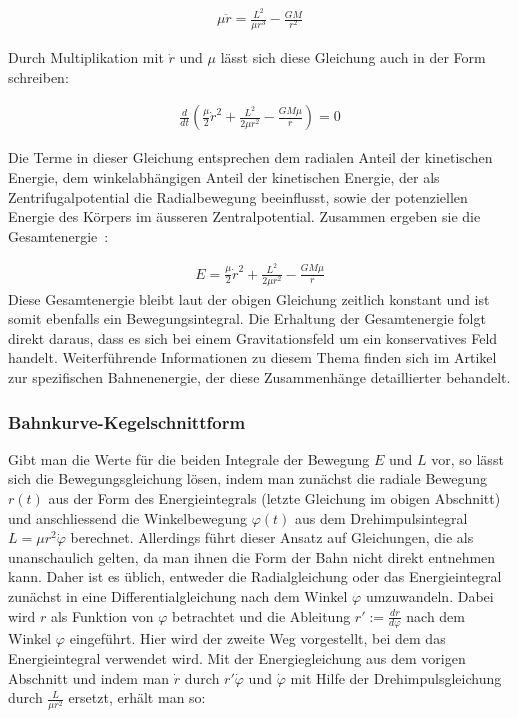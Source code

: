 \documentclass[a4paper,12pt,twoside]{article}
\begin{document}
\begin{align*}
	\mu \ddot{r} = \frac{L^2}{\mu r^3} - \frac{G M}{r^2}
\end{align*}

Durch Multiplikation mit \( \dot{r} \) und \( \mu \) lässt sich diese Gleichung auch in der Form schreiben:

\begin{align*}
	\frac{d}{dt} \left( \frac{\mu}{2} \dot{r}^2 + \frac{L^2}{2 \mu r^2} - \frac{GM \mu}{r} \right) = 0
\end{align*}

Die Terme in dieser Gleichung entsprechen dem radialen Anteil der kinetischen Energie, dem winkelabhängigen Anteil der kinetischen Energie, der als Zentrifugalpotential die Radialbewegung beeinflusst, sowie der potenziellen Energie des Körpers im äusseren Zentralpotential. Zusammen ergeben sie die Gesamtenergie~\cite{Physik-Schule}:

\begin{align*}
	E = \frac{\mu}{2} \dot{r}^2 + \frac{L^2}{2 \mu r^2} - \frac{GM \mu}{r}
\end{align*}
Diese Gesamtenergie bleibt laut der obigen Gleichung zeitlich konstant und ist somit ebenfalls ein Bewegungsintegral. Die Erhaltung der Gesamtenergie folgt direkt daraus, dass es sich bei einem Gravitationsfeld um ein konservatives Feld handelt. Weiterführende Informationen zu diesem Thema finden sich im Artikel zur spezifischen Bahnenenergie, der diese Zusammenhänge detaillierter behandelt.

\subsubsection{Bahnkurve-Kegelschnittform}

Gibt man die Werte für die beiden Integrale der Bewegung \( E \) und \( L \) vor, so lässt sich die Bewegungsgleichung lösen, indem man zunächst die radiale Bewegung \( r(t) \) aus der Form des Energieintegrals (letzte Gleichung im obigen Abschnitt) und anschliessend die Winkelbewegung \( \varphi(t) \) aus dem Drehimpulsintegral \( L = \mu r^2 \dot{\varphi} \) berechnet. 
Allerdings führt dieser Ansatz auf Gleichungen, die als unanschaulich gelten, da man ihnen die Form der Bahn nicht direkt entnehmen kann. 
Daher ist es üblich, entweder die Radialgleichung oder das Energieintegral zunächst in eine Differentialgleichung nach dem Winkel \( \varphi \) umzuwandeln. Dabei wird \( r \) als Funktion von \( \varphi \) betrachtet und die Ableitung \( r' := \frac{dr}{d\varphi} \) nach dem Winkel \( \varphi \) eingeführt. 
Hier wird der zweite Weg vorgestellt, bei dem das Energieintegral verwendet wird. 
Mit der Energiegleichung aus dem vorigen Abschnitt und indem man \( \dot{r} \) durch \( r' \dot{\varphi} \) und \( \dot{\varphi} \) mit Hilfe der Drehimpulsgleichung durch \( \frac{L}{\mu r^2} \) ersetzt, erhält man so:
\end{document}
